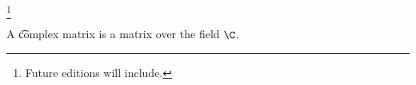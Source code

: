 
\footnote{Future editions will include.}


A \t{complex matrix} is a matrix over the field $\C$.

\blankpage
